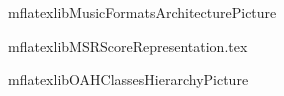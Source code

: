\documentclass[11pt,a4paper]{report}
\begin{document}
\useRegularPagesHeadersAndFooters

{mflatexlibMusicFormatsArchitecturePicture}

{mflatexlibMSRScoreRepresentation.tex}

{mflatexlibOAHClassesHierarchyPicture}



\useListsPagesHeadersAndFooters


\end{document}
